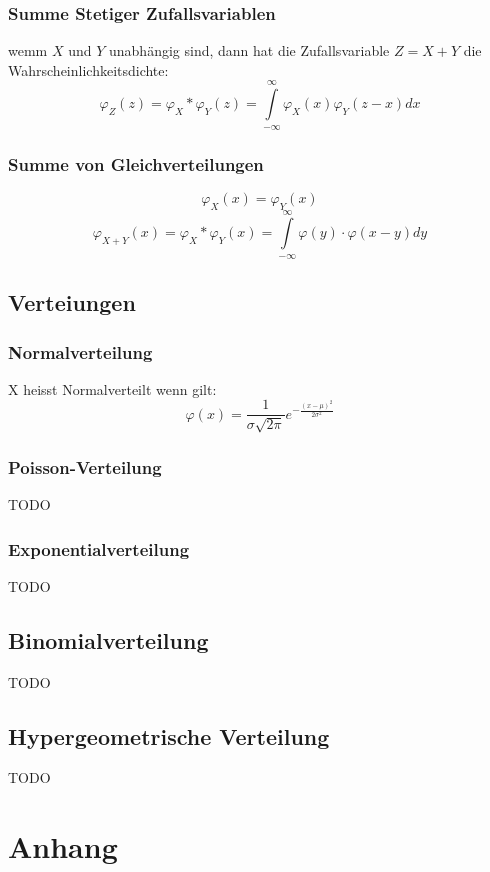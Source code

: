 \documentclass[margin=normal]{tex/hsrzf}
\begin{document}
\begin{multicols}{2}
    \subsubsection*{Summe Stetiger Zufallsvariablen}
    wemm $X$ und $Y$ unabhängig sind, dann hat die Zufallsvariable $Z = X + Y$ die Wahrscheinlichkeitsdichte:
    $$\varphi_Z(z) = \varphi_X * \varphi_Y(z) = \int \limits _{-\infty} ^{\infty}  \varphi_X(x) \varphi_Y(z-x)dx$$

    \subsubsection*{Summe von Gleichverteilungen}
    $$\varphi_X(x) = \varphi_Y(x)$$
    $$\varphi_{X+Y}(x) = \varphi_X * \varphi_Y(x) = \int \limits _{-\infty} ^{\infty} \varphi(y)\cdot \varphi(x-y)dy $$
\end{multicols}

\subsection{Verteiungen}
\subsubsection{Normalverteilung}
X heisst Normalverteilt wenn gilt:
$$\varphi(x) = \frac{1}{\sigma \sqrt{2\pi}} e^{-\frac{(x-\mu)^2}{2\sigma^2}}$$

\subsubsection{Poisson-Verteilung}
{\huge TODO}

\subsubsection{Exponentialverteilung}
{\huge TODO}
\subsection{Binomialverteilung}
{\huge TODO}

\subsection{Hypergeometrische Verteilung}
{\huge TODO}




\section{Anhang}
\end{document}
